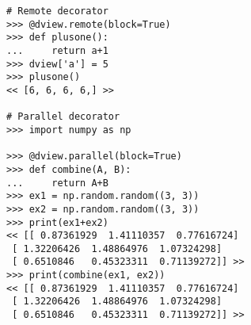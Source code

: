 \begin{lstlisting}
# Remote decorator
>>> @dview.remote(block=True)
>>> def plusone():
...     return a+1
>>> dview['a'] = 5
>>> plusone()
<< [6, 6, 6, 6,] >>

# Parallel decorator
>>> import numpy as np

>>> @dview.parallel(block=True)
>>> def combine(A, B):
...     return A+B
>>> ex1 = np.random.random((3, 3))
>>> ex2 = np.random.random((3, 3))
>>> print(ex1+ex2)
<< [[ 0.87361929  1.41110357  0.77616724]
 [ 1.32206426  1.48864976  1.07324298]
 [ 0.6510846   0.45323311  0.71139272]] >>
>>> print(combine(ex1, ex2))
<< [[ 0.87361929  1.41110357  0.77616724]
 [ 1.32206426  1.48864976  1.07324298]
 [ 0.6510846   0.45323311  0.71139272]] >>
 \end{lstlisting}

